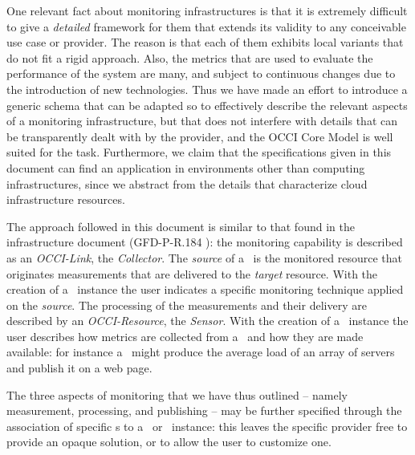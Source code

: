 \documentclass[10pt,a4paper]{article}
\begin{document}
One relevant fact about monitoring infrastructures is that it is extremely difficult to give a {\em detailed} framework for them that extends its validity to any conceivable use case or provider. The reason is that each of them exhibits local variants that do not fit a rigid approach. Also, the metrics that are used to evaluate the performance of the system are many, and subject to continuous changes due to the introduction of new technologies. Thus we have made an effort to introduce a generic schema that can be adapted so to effectively describe the relevant aspects of a monitoring infrastructure, but that does not interfere with details that can be transparently dealt with by the provider, and the OCCI Core Model \cite{occi:core} is well suited for the task. Furthermore, we claim that the specifications given in this document can find an application in environments other than computing infrastructures, since we abstract from the details that characterize cloud infrastructure resources.

The approach followed in this document is similar to that found in the infrastructure document (GFD-P-R.184 \cite{occi:infrastructure}): the monitoring capability is described as an {\em OCCI-Link}, the {\em Collector}. The {\em source} of a \coll\ is the monitored resource that originates measurements that are delivered to the {\em target} resource. With the creation of a \coll\ instance the user indicates a specific monitoring technique applied on the {\em source}. The processing of the measurements and their delivery are described by an {\em OCCI-Resource}, the {\em Sensor}. With the creation of a \sens\ instance the user describes how metrics are collected from a \coll\ and how they are made available: for instance a \sens\ might produce the average load of an array of servers and publish it on a web page.

The three aspects of monitoring that we have thus outlined -- namely measurement, processing, and publishing -- may be further specified through the association of specific \mi s to a \sens\ or \coll\ instance: this leaves the specific provider free to provide an opaque solution, or to allow the user to customize one.


\end{document}
